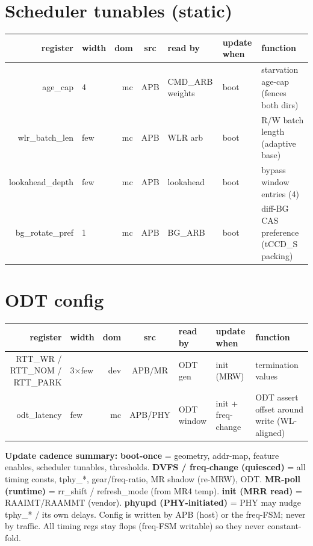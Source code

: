 \documentclass[9pt]{extarticle}
\newenvironment{cfg}{%
  \footnotesize\begin{longtable}{R W D S B U F}
  \rowcolor{hb}\textbf{register} & \textbf{width} & \textbf{dom} & \textbf{src} & \textbf{read by} & \textbf{update when} & \textbf{function}\\ \midrule\endhead}
  {\bottomrule\end{longtable}}
\begin{document}
\section{Scheduler tunables  (static)}
\begin{cfg}
age\_cap & 4 & mc & APB & CMD\_ARB weights & boot & starvation age-cap (fences both dirs)\\
wlr\_batch\_len & few & mc & APB & WLR arb & boot & R/W batch length (adaptive base)\\
lookahead\_depth & few & mc & APB & lookahead & boot & bypass window entries (4)\\
bg\_rotate\_pref & 1 & mc & APB & BG\_ARB & boot & diff-BG CAS preference (tCCD\_S packing)\\
\end{cfg}

\section{ODT config}
\begin{cfg}
RTT\_WR / RTT\_NOM / RTT\_PARK & 3$\times$few & dev & APB/MR & ODT gen & init (MRW) & termination values\\
odt\_latency & few & mc & APB/PHY & ODT window & init + freq-change & ODT assert offset around write (WL-aligned)\\
\end{cfg}

\vspace{3pt}
{\footnotesize \textbf{Update cadence summary:} \textbf{boot-once} = geometry, addr-map, feature enables,
scheduler tunables, thresholds. \textbf{DVFS / freq-change (quiesced)} = all timing consts, tphy\_*,
gear/freq-ratio, MR shadow (re-MRW), ODT. \textbf{MR-poll (runtime)} = rr\_shift / refresh\_mode
(from MR4 temp). \textbf{init (MRR read)} = RAAIMT/RAAMMT (vendor). \textbf{phyupd (PHY-initiated)} =
PHY may nudge tphy\_* / its own delays. Config is written by APB (host) or the freq-FSM; never by
traffic. All timing regs stay flops (freq-FSM writable) so they never constant-fold.}
\end{document}
